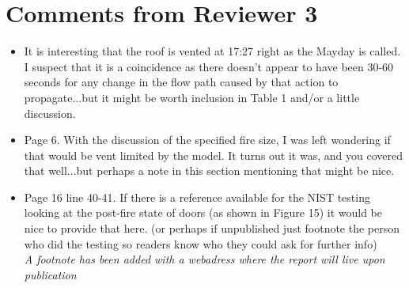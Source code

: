 \documentclass[12pt]{article}
\begin{document}
\section{Comments from Reviewer 3}
\begin{itemize}
\item It is interesting that the roof is vented at 17:27 right as the Mayday is called.  I suspect that it is a coincidence as there doesn't appear to have been 30-60 seconds for any change in the flow path caused by that action to propagate...but it might be worth inclusion in Table 1 and/or a little discussion.
\item Page 6.  With the discussion of the specified fire size, I was left wondering if that would be vent limited by the model.  It turns out it was, and you covered that well...but perhaps a note in this section mentioning that might be nice.
\item Page 16 line 40-41.  If there is a reference available for the NIST testing looking at the post-fire state of doors (as shown in Figure 15) it would be nice to provide that here. (or perhaps if unpublished just footnote the person who did the testing so readers know who they could ask for further info) \\
{\it A footnote has been added with a webadress where the report will live upon publication}
\end{itemize}
\end{document}
